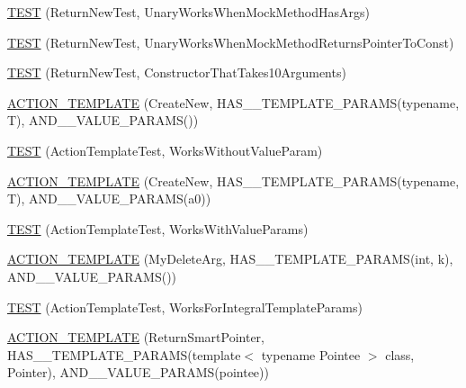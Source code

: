 \begin{DoxyCompactItemize}
\item 
\mbox{\hyperlink{namespacetesting_1_1gmock__generated__actions__test_ad8f696b14b0f2dba4986c53f615aef15}{T\+E\+ST}} (Return\+New\+Test, Unary\+Works\+When\+Mock\+Method\+Has\+Args)
\item 
\mbox{\hyperlink{namespacetesting_1_1gmock__generated__actions__test_ad9f45ddc4a5616b919116c766ad37a30}{T\+E\+ST}} (Return\+New\+Test, Unary\+Works\+When\+Mock\+Method\+Returns\+Pointer\+To\+Const)
\item 
\mbox{\hyperlink{namespacetesting_1_1gmock__generated__actions__test_a1ed6392f4aeb68b9429ff7dd98ce5a86}{T\+E\+ST}} (Return\+New\+Test, Constructor\+That\+Takes10\+Arguments)
\item 
\mbox{\hyperlink{namespacetesting_1_1gmock__generated__actions__test_a1debc0726715951fcd7f5443e436dc46}{A\+C\+T\+I\+O\+N\+\_\+\+T\+E\+M\+P\+L\+A\+TE}} (Create\+New, H\+A\+S\+\_\+\_\+\+T\+E\+M\+P\+L\+A\+T\+E\+\_\+\+P\+A\+R\+A\+MS(typename, T), A\+N\+D\+\_\+\_\+\+V\+A\+L\+U\+E\+\_\+\+P\+A\+R\+A\+MS())
\item 
\mbox{\hyperlink{namespacetesting_1_1gmock__generated__actions__test_aaac879cbe00638dcc2d4733760180a4f}{T\+E\+ST}} (Action\+Template\+Test, Works\+Without\+Value\+Param)
\item 
\mbox{\hyperlink{namespacetesting_1_1gmock__generated__actions__test_a38fb8047f95126bb0b2cfe7e670c8af7}{A\+C\+T\+I\+O\+N\+\_\+\+T\+E\+M\+P\+L\+A\+TE}} (Create\+New, H\+A\+S\+\_\+\_\+\+T\+E\+M\+P\+L\+A\+T\+E\+\_\+\+P\+A\+R\+A\+MS(typename, T), A\+N\+D\+\_\+\_\+\+V\+A\+L\+U\+E\+\_\+\+P\+A\+R\+A\+MS(a0))
\item 
\mbox{\hyperlink{namespacetesting_1_1gmock__generated__actions__test_a21f6e2ad5c4c1afecca93a42c9a84f1a}{T\+E\+ST}} (Action\+Template\+Test, Works\+With\+Value\+Params)
\item 
\mbox{\hyperlink{namespacetesting_1_1gmock__generated__actions__test_aaaac0fbf0bf2c7bd8fc104310e6af25c}{A\+C\+T\+I\+O\+N\+\_\+\+T\+E\+M\+P\+L\+A\+TE}} (My\+Delete\+Arg, H\+A\+S\+\_\+\_\+\+T\+E\+M\+P\+L\+A\+T\+E\+\_\+\+P\+A\+R\+A\+MS(int, k), A\+N\+D\+\_\+\_\+\+V\+A\+L\+U\+E\+\_\+\+P\+A\+R\+A\+MS())
\item 
\mbox{\hyperlink{namespacetesting_1_1gmock__generated__actions__test_aad8d77a35ac21f366dc334a45cf5b140}{T\+E\+ST}} (Action\+Template\+Test, Works\+For\+Integral\+Template\+Params)
\item 
\mbox{\hyperlink{namespacetesting_1_1gmock__generated__actions__test_ad99d926be507eb0c031538da2e8bb838}{A\+C\+T\+I\+O\+N\+\_\+\+T\+E\+M\+P\+L\+A\+TE}} (Return\+Smart\+Pointer, H\+A\+S\+\_\+\_\+\+T\+E\+M\+P\+L\+A\+T\+E\+\_\+\+P\+A\+R\+A\+MS(template$<$ typename Pointee $>$ class, Pointer), A\+N\+D\+\_\+\_\+\+V\+A\+L\+U\+E\+\_\+\+P\+A\+R\+A\+MS(pointee))

\end{DoxyCompactItemize}
